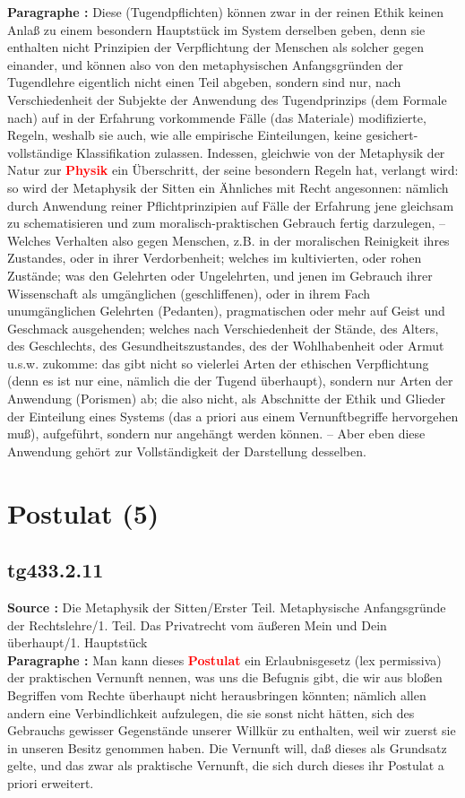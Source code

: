 \documentclass[a4paper,12pt,twoside]{book}
\newcommand{\match}[1]{\textcolor{red}{\textbf{#1}}}
\newcommand{\unnumberedsection}[1]{
	\section*{#1}
	\addcontentsline{toc}{section}{#1}
	\markright{#1}
}
\begin{document}
	\textbf{Paragraphe : }Diese (Tugendpflichten) können zwar in der reinen Ethik keinen Anlaß zu einem besondern Hauptstück im System derselben geben, denn sie enthalten nicht Prinzipien der Verpflichtung der Menschen als solcher gegen einander, und können also von den metaphysischen Anfangsgründen der Tugendlehre eigentlich nicht einen Teil abgeben, sondern sind nur, nach Verschiedenheit der Subjekte der Anwendung des Tugendprinzips (dem Formale nach) auf in der Erfahrung vorkommende Fälle (das Materiale) modifizierte, Regeln, weshalb sie auch, wie alle empirische Einteilungen, keine gesichert-vollständige Klassifikation zulassen. Indessen, gleichwie von der Metaphysik der Natur zur \match{Physik} ein Überschritt, der seine besondern Regeln hat, verlangt wird: so wird der Metaphysik der Sitten ein Ähnliches mit Recht angesonnen: nämlich durch Anwendung reiner Pflichtprinzipien auf Fälle der Erfahrung jene gleichsam  zu schematisieren und zum moralisch-praktischen Gebrauch fertig darzulegen, – Welches Verhalten also gegen Menschen, z.B. in der moralischen Reinigkeit ihres Zustandes, oder in ihrer Verdorbenheit; welches im kultivierten, oder rohen Zustände; was den Gelehrten oder Ungelehrten, und jenen im Gebrauch ihrer Wissenschaft als umgänglichen (geschliffenen), oder in ihrem Fach unumgänglichen Gelehrten (Pedanten), pragmatischen oder mehr auf Geist und Geschmack ausgehenden; welches nach Verschiedenheit der Stände, des Alters, des Geschlechts, des Gesundheitszustandes, des der Wohlhabenheit oder Armut u.s.w. zukomme: das gibt nicht so vielerlei Arten der ethischen Verpflichtung (denn es ist nur eine, nämlich die der Tugend überhaupt), sondern nur Arten der Anwendung (Porismen) ab; die also nicht, als Abschnitte der Ethik und Glieder der Einteilung eines Systems (das a priori aus einem Vernunftbegriffe hervorgehen muß), aufgeführt, sondern nur angehängt werden können. – Aber eben diese Anwendung gehört zur Vollständigkeit der Darstellung desselben. 
	
	\unnumberedsection{Postulat (5)} 
	\subsection*{tg433.2.11} 
	\textbf{Source : }Die Metaphysik der Sitten/Erster Teil. Metaphysische Anfangsgründe der Rechtslehre/1. Teil. Das Privatrecht vom äußeren Mein und Dein überhaupt/1. Hauptstück\\  
	
	\textbf{Paragraphe : }Man kann dieses \match{Postulat} ein Erlaubnisgesetz (lex permissiva) der praktischen Vernunft nennen, was uns die Befugnis gibt, die wir aus bloßen Begriffen vom Rechte überhaupt nicht herausbringen könnten; nämlich allen andern eine Verbindlichkeit aufzulegen, die sie sonst nicht hätten, sich des Gebrauchs gewisser Gegenstände unserer Willkür zu enthalten, weil wir zuerst sie in unseren Besitz genommen haben. Die Vernunft will, daß dieses als Grundsatz gelte, und das zwar als praktische Vernunft, die sich durch dieses ihr Postulat a priori erweitert. 
	
\end{document}
